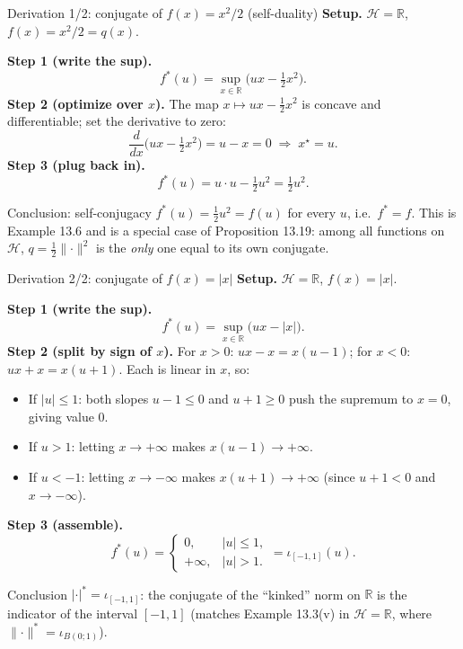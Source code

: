 \documentclass[aspectratio=169,10pt]{beamer}
\newcommand{\R}{\mathbb{R}}
\newcommand{\Hil}{\mathcal{H}}
\newcommand{\norm}[1]{\lVert #1 \rVert}
\newcommand{\conj}[1]{#1^{*}}
\begin{document}
\begin{frame}{Derivation 1/2: conjugate of $f(x)=x^2/2$ (self-duality)}
  \textbf{Setup.} $\Hil=\R$, $f(x) = x^2/2 = q(x)$.

  \textbf{Step 1 (write the sup).}
  \[
    \conj f(u) = \sup_{x\in\R}\Big(ux - \tfrac12 x^2\Big).
  \]
  \textbf{Step 2 (optimize over $x$).} The map $x\mapsto ux-\tfrac12 x^2$ is
  concave and differentiable; set the derivative to zero:
  \[
    \frac{d}{dx}\Big(ux-\tfrac12 x^2\Big) = u - x = 0 \;\Longrightarrow\; x^\star = u.
  \]
  \textbf{Step 3 (plug back in).}
  \[
    \conj f(u) = u\cdot u - \tfrac12 u^2 = \tfrac12 u^2.
  \]
  \begin{alertblock}{Conclusion: self-conjugacy}
    $\conj f(u) = \tfrac12 u^2 = f(u)$ for every $u$, i.e.\ $f^{*}=f$. This
    is Example 13.6 and is a special case of Proposition 13.19: among all
    functions on $\Hil$, $q=\tfrac12\norm{\cdot}^2$ is the \emph{only} one
    equal to its own conjugate.
  \end{alertblock}
\end{frame}

\begin{frame}{Derivation 2/2: conjugate of $f(x)=|x|$}
  \textbf{Setup.} $\Hil=\R$, $f(x)=|x|$.

  \textbf{Step 1 (write the sup).}
  \[
    \conj f(u) = \sup_{x\in\R}\big(ux - |x|\big).
  \]
  \textbf{Step 2 (split by sign of $x$).} For $x>0$: $ux-x = x(u-1)$; for
  $x<0$: $ux+x=x(u+1)$. Each is linear in $x$, so:
  \begin{itemize}
    \item If $|u|\le 1$: both slopes $u-1\le0$ and $u+1\ge 0$ push the
      supremum to $x=0$, giving value $0$.
    \item If $u>1$: letting $x\to+\infty$ makes $x(u-1)\to+\infty$.
    \item If $u<-1$: letting $x\to-\infty$ makes $x(u+1)\to+\infty$
      (since $u+1<0$ and $x\to-\infty$).
  \end{itemize}
  \textbf{Step 3 (assemble).}
  \[
    \conj f(u) =
    \begin{cases}
      0, & |u|\le 1,\\
      +\infty, & |u|>1.
    \end{cases}
    = \iota_{[-1,1]}(u).
  \]
  \begin{alertblock}{Conclusion}
    $\conj{|\cdot|} = \iota_{[-1,1]}$: the conjugate of the ``kinked'' norm
    on $\R$ is the indicator of the interval $[-1,1]$ (matches Example
    13.3(v) in $\Hil=\R$, where $\conj{\norm{\cdot}}=\iota_{B(0;1)}$).
  \end{alertblock}
\end{frame}
\end{document}
